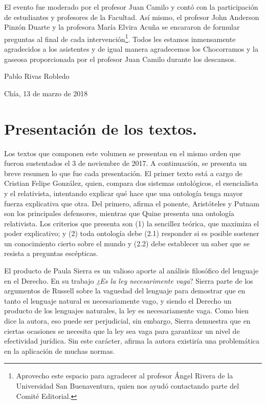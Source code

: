\documentclass[]{book}
\begin{document}
El evento fue moderado por el profesor Juan Camilo y contó con la
participación de estudiantes y profesores de la Facultad. Así mismo, el
profesor John Anderson Pinzón Duarte y la profesora María Elvira Acuña
se encararon de formular preguntas al final de cada
intervención\footnote{Aprovecho este espacio para agradecer al profesor
  Ángel Rivera de la Universidad San Buenaventura, quien nos ayudó
  contactando parte del Comité Editorial.}. Todos les estamos
inmensamente agradecidos a los asistentes y de igual manera agradecemos
los Chocorramos y la gaseosa proporcionada por el profesor Juan Camilo
durante los descansos.

\begin{flushright}
	Pablo Rivas Robledo

Chía, 13 de marzo de 2018
\end{flushright}

\chapter{\texorpdfstring{\textbf{Presentación de los
textos.}}{Presentación de los textos.}}\label{presentaciuxf3n-de-los-textos.}

Los textos que componen este volumen se presentan en el mismo orden que
fueron sustentados el 3 de noviembre de 2017. A continuación, se
presenta un breve resumen lo que fue cada presentación. El primer texto
está a cargo de Cristian Felipe González, quien, compara dos sistemas
ontológicos, el esencialista y el relativista, intentando explicar qué
hace que una ontología tenga mayor fuerza explicativa que otra. Del
primero, afirma el ponente, Aristóteles y Putnam son los principales
defensores, mientras que Quine presenta una ontología relativista. Los
criterios que presenta son (1) la sencillez teórica, que maximiza el
poder explicativo; y (2) toda ontología debe (2.1) responder si es
posible sostener un conocimiento cierto sobre el mundo y (2.2) debe
establecer un saber que se resista a preguntas escépticas.

El producto de Paula Sierra es un valioso aporte al análisis filosófico
del lenguaje en el Derecho. En su trabajo \emph{¿Es la ley necesarimente
vaga}? Sierra parte de los argumentos de Russell sobre la vaguedad del
lenguaje para demostrar que en tanto el lenguaje natural es
necesariamente vago, y siendo el Derecho un producto de los lenguajes
naturales, la ley es necesariamente vaga. Como bien dice la autora, eso
puede ser perjudicial, sin embargo, Sierra demuestra que en ciertas
ocasiones se necesita que la ley sea vaga para garantizar un nivel de
efectividad jurídica. Sin este carácter, afirma la autora existiría una
problemática en la aplicación de muchas normas.
\end{document}
